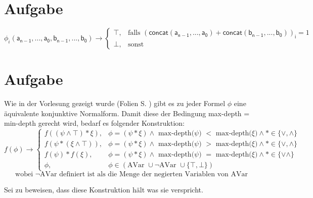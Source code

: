 \documentclass[a4paper,10pt]{scrartcl}
\begin{document}
\section{Aufgabe}
$$\phi_i\mathsf{(a_{n-1},...,a_0,b_{n-1},...,b_0)} \rightarrow 
\begin{cases} \top ,& \textrm{falls } \mathsf{(concat(a_{n-1},...,a_0) + concat(b_{n-1},...,b_0))_i}  = 1 \\ \bot,  & \textrm{sonst }\end{cases}$$
\section{Aufgabe}
Wie in der Vorlesung gezeigt wurde (Folien S. ) gibt es zu jeder Formel $\phi$ eine äquivalente konjunktive Normalform. Damit diese der Bedingung max-depth = min-depth gerecht wird, bedarf es folgender Konstruktion: \\
$$f(\phi) \rightarrow \begin{cases}f((\psi \land \top) * \xi), & \phi = (\psi * \xi) \land \textrm{ max-depth($\psi$) $<$ max-depth($\xi$)} \land * \in \{ \lor, \land\} \\ f(\psi * (\xi \land \top)), & \phi = (\psi * \xi) \land \textrm{ max-depth($\psi$) $>$ max-depth($\xi$)} \land * \in \{ \lor, \land\}  \\
f(\psi) * f(\xi), & \phi = (\psi * \xi) \land \textrm{ max-depth($\psi$) $=$ max-depth($\xi$)} \land * \in \{ \lor \land\} \\ \phi ,& \phi \in (\textrm{AVar } \cup \lnot\textrm{AVar } \cup \{\top, \bot  \})\end{cases} $$ $$ \textrm{wobei $\lnot$AVar definiert ist als die Menge der negierten Variablen von AVar} $$


Sei zu beweisen, dass diese Konstruktion hält was sie verspricht. 
\end{document}
